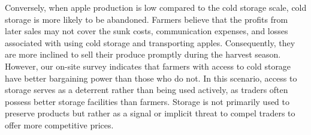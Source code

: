 Conversely, when apple production is low compared to the cold storage scale, cold storage is more likely to be abandoned. Farmers believe that the profits from later sales may not cover the sunk costs, communication expenses, and losses associated with using cold storage and transporting apples. Consequently, they are more inclined to sell their produce promptly during the harvest season. However, our on-site survey indicates that farmers with access to cold storage have better bargaining power than those who do not. In this scenario, access to storage serves as a deterrent rather than being used actively, as traders often possess better storage facilities than farmers. Storage is not primarily used to preserve products but rather as a signal or implicit threat to compel traders to offer more competitive prices.

